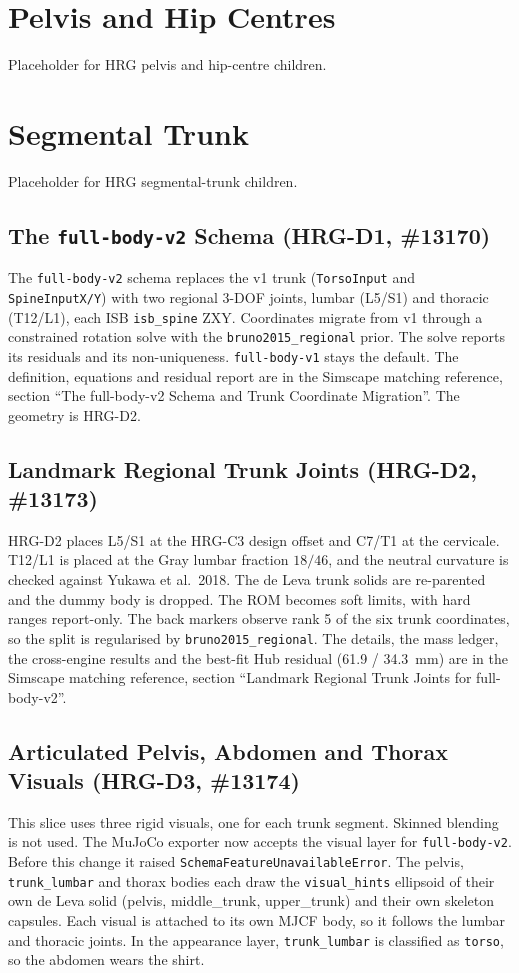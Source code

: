\documentclass[11pt,a4paper]{article}
\begin{document}
\section{Pelvis and Hip Centres}
Placeholder for HRG pelvis and hip-centre children.

\section{Segmental Trunk}
Placeholder for HRG segmental-trunk children.

\subsection{The \texttt{full-body-v2} Schema (HRG-D1, \#13170)}
The \texttt{full-body-v2} schema replaces the v1 trunk (\texttt{TorsoInput}
and \texttt{SpineInputX/Y}) with two regional 3-DOF joints, lumbar (L5/S1)
and thoracic (T12/L1), each ISB \texttt{isb\_spine} ZXY. Coordinates migrate
from v1 through a constrained rotation solve with the
\texttt{bruno2015\_regional} prior. The solve reports its residuals and its
non-uniqueness. \texttt{full-body-v1} stays the default. The definition,
equations and residual report are in the Simscape matching reference,
section ``The full-body-v2 Schema and Trunk Coordinate Migration''. The geometry
is HRG-D2.

\subsection{Landmark Regional Trunk Joints (HRG-D2, \#13173)}
HRG-D2 places L5/S1 at the HRG-C3 design offset and C7/T1 at the cervicale.
T12/L1 is placed at the Gray lumbar fraction $18/46$, and the neutral
curvature is checked against Yukawa et al.\ 2018. The de Leva trunk solids
are re-parented and the dummy body is dropped. The ROM becomes soft limits,
with hard ranges report-only. The back markers observe rank 5 of the six
trunk coordinates, so the split is regularised by
\texttt{bruno2015\_regional}. The details, the mass ledger, the cross-engine
results and the best-fit Hub residual (61.9 / 34.3~mm) are in the Simscape
matching reference, section ``Landmark Regional Trunk Joints for
full-body-v2''.

\subsection{Articulated Pelvis, Abdomen and Thorax Visuals (HRG-D3, \#13174)}
This slice uses three rigid visuals, one for each trunk segment. Skinned
blending is not used. The MuJoCo exporter now accepts the visual layer for
\texttt{full-body-v2}. Before this change it raised
\texttt{SchemaFeatureUnavailableError}. The pelvis, \texttt{trunk\_lumbar}
and thorax bodies each draw the \texttt{visual\_hints} ellipsoid of their own
de Leva solid (pelvis, middle\_trunk, upper\_trunk) and their own skeleton
capsules. Each visual is attached to its own MJCF body, so it follows the
lumbar and thoracic joints. In the appearance layer,
\texttt{trunk\_lumbar} is classified as \texttt{torso}, so the abdomen wears
the shirt.
\end{document}
